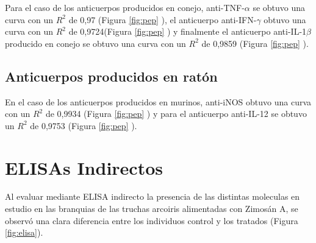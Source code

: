\documentclass[12pt,letterpaper,oneside]{scrbook}
\begin{document}
Para el caso de los anticuerpos producidos en conejo,
anti-TNF-\(\alpha\) se obtuvo una curva con un \(R^2\) de 0,97 (Figura
\ref{fig:pep} ), el anticuerpo anti-IFN-\(\gamma\)
obtuvo una curva con un \(R^2\) de 0,9724(Figura \ref{fig:pep}
) y finalmente el anticuerpo anti-IL-1\(\beta\)
producido en conejo se obtuvo una curva con un \(R^2\) de 0,9859 (Figura
\ref{fig:pep} ).

\subsection{Anticuerpos producidos en ratón}

En el caso de los anticuerpos producidos en murinos, anti-iNOS obtuvo
una curva con un \(R^2\) de 0,9934 (Figura \ref{fig:pep}
) y para el anticuerpo anti-IL-12 se obtuvo un
\(R^2\) de 0,9753 (Figura \ref{fig:pep} ).

\section{ELISAs Indirectos}

Al evaluar mediante ELISA indirecto la presencia de las distintas
moleculas en estudio en las branquias de las truchas arcoiris
alimentadas con Zimosán A, se observó una clara diferencia entre los
individuos control y los tratados (Figura \ref{fig:elisa}).
\end{document}

